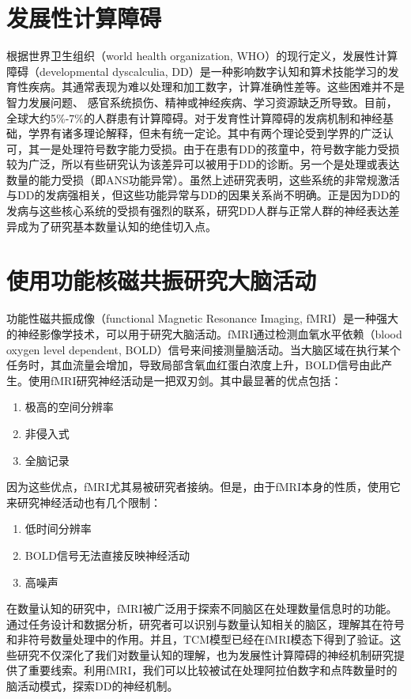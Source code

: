 \documentclass[bachelor, comfort]{shtthesis}
\begin{document}
\section{发展性计算障碍}
根据世界卫生组织（world health organization, WHO）的现行定义，发展性计算障碍（developmental dyscalculia, DD）是一种影响数字认知和算术技能学习的发育性疾病。其通常表现为难以处理和加工数字，计算准确性差等。这些困难并不是智力发展问题、 感官系统损伤、精神或神经疾病、学习资源缺乏所导致\cite{who}。目前，全球大约5\%-7\%的人群患有计算障碍\cite{num29,num28}。对于发育性计算障碍的发病机制和神经基础，学界有诸多理论解释，但未有统一定论。其中有两个理论受到学界的广泛认可，其一是处理符号数字能力受损\cite{num30}。由于在患有DD的孩童中，符号数字能力受损较为广泛，所以有些研究认为该差异可以被用于DD的诊断\cite{num31}。另一个是处理或表达数量的能力受损（即ANS功能异常）\cite{num32}。虽然上述研究表明，这些系统的非常规激活与DD的发病强相关，但这些功能异常与DD的因果关系尚不明确。正是因为DD的发病与这些核心系统的受损有强烈的联系，研究DD人群与正常人群的神经表达差异成为了研究基本数量认知的绝佳切入点。


\section{使用功能核磁共振研究大脑活动}
功能性磁共振成像（functional Magnetic Resonance Imaging, fMRI）是一种强大的神经影像学技术，可以用于研究大脑活动。fMRI通过检测血氧水平依赖（blood oxygen level dependent, BOLD）信号来间接测量脑活动。当大脑区域在执行某个任务时，其血流量会增加，导致局部含氧血红蛋白浓度上升，BOLD信号由此产生\cite{bold1}。使用fMRI研究神经活动是一把双刃剑。其中最显著的优点包括：

\begin{enumerate}
	\item 极高的空间分辨率
	\item 非侵入式
	\item 全脑记录
\end{enumerate}

因为这些优点，fMRI尤其易被研究者接纳。但是，由于fMRI本身的性质，使用它来研究神经活动也有几个限制：

\begin{enumerate}
	\item 低时间分辨率
	\item BOLD信号无法直接反映神经活动
	\item 高噪声
\end{enumerate}

在数量认知的研究中，fMRI被广泛用于探索不同脑区在处理数量信息时的功能。通过任务设计和数据分析，研究者可以识别与数量认知相关的脑区，理解其在符号和非符号数量处理中的作用。并且，TCM模型已经在fMRI模态下得到了验证\cite{bold2}。这些研究不仅深化了我们对数量认知的理解，也为发展性计算障碍的神经机制研究提供了重要线索。利用fMRI，我们可以比较被试在处理阿拉伯数字和点阵数量时的脑活动模式，探索DD的神经机制。
\end{document}
